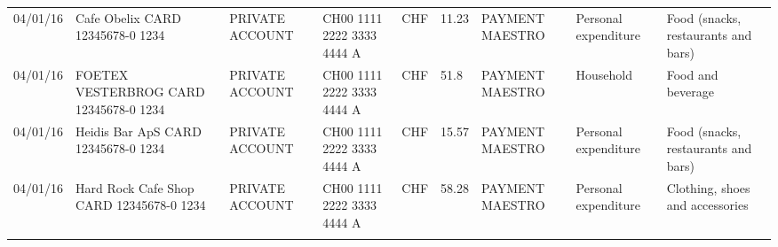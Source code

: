 \begin{landscape}
\begin{center}
\begin{longtable}{lllllllll}
		04/01/16 & Cafe Obelix CARD 12345678-0 1234 & PRIVATE ACCOUNT & CH00 1111 2222 3333 4444 A & CHF   & 11.23 & PAYMENT MAESTRO & Personal expenditure & Food (snacks, restaurants and bars) \\
		04/01/16 & FOETEX VESTERBROG CARD 12345678-0 1234 & PRIVATE ACCOUNT & CH00 1111 2222 3333 4444 A & CHF   & 51.8  & PAYMENT MAESTRO & Household & Food and beverage \\
		04/01/16 & Heidis Bar ApS CARD 12345678-0 1234 & PRIVATE ACCOUNT & CH00 1111 2222 3333 4444 A & CHF   & 15.57 & PAYMENT MAESTRO & Personal expenditure & Food (snacks, restaurants and bars) \\
		04/01/16 & Hard Rock Cafe Shop CARD 12345678-0 1234 & PRIVATE ACCOUNT & CH00 1111 2222 3333 4444 A & CHF   & 58.28 & PAYMENT MAESTRO & Personal expenditure & Clothing, shoes and accessories \\
	\label{tab:addlabel}%
\end{longtable}%

\end{center}
		
\end{landscape}

